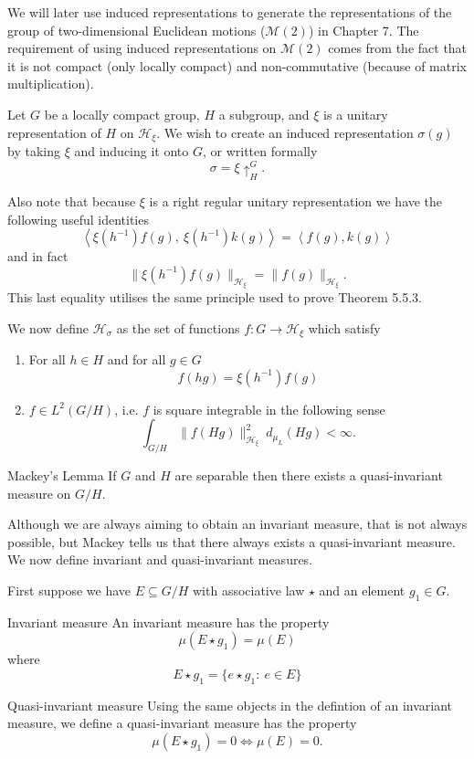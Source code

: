 \documentclass{article}
\begin{document}
We will later use induced representations to generate the representations of the group of two-dimensional Euclidean motions ($\mathcal{M}(2)$) in Chapter 7. The requirement of using induced representations on $\mathcal{M}(2)$ comes from the fact that it is not compact (only locally compact) and non-commutative (because of matrix multiplication). 

Let $G$ be a locally compact group, $H$ a subgroup, and $\xi$ is a unitary representation of $H$ on $\mathcal{H}_{\xi}$. We wish to create an induced representation $\sigma(g)$ by taking $\xi$ and inducing it onto $G$, or written formally 
\[ 
    \sigma = \xi \uparrow^{G}_{H}  
.\] 

\begin{remark}
Also note that because $\xi$ is a right regular unitary representation we have the following useful identities
\[ 
    \left\langle \xi(h^{-1})f(g), \ \xi(h^{-1})k(g) \right\rangle = \left\langle f(g), k(g) \right\rangle 
\]
and in fact
\[ 
    \| \xi(h^{-1})f(g) \|_{\mathcal{H}_{\xi}} = \| f(g) \|_{\mathcal{H}_{\xi}} .
\]
This last equality utilises the same principle used to prove Theorem 5.5.3.
\end{remark}

We now define $\mathcal{H}_{\sigma}$ as the set of functions $f: G \rightarrow \mathcal{H}_{\xi}$ which satisfy
\begin{enumerate}
    \item For all $h \in H$ and for all $g \in G$ 
        \[ 
            f(hg) = \xi(h^{-1})f(g) 
        \]
    \item $f \in L^{2}(G/H)$, i.e. $f$ is square integrable in the following sense
        \[%
            \int_{G/H} \| f(Hg) \|^{2}_{\mathcal{H}_{\xi}} \ d_{\mu_{L}}(Hg) < \infty.
        \]%
\end{enumerate}

\begin{Theorem}{Mackey's Lemma}
    If $G$ and $H$ are separable then there exists a quasi-invariant measure on $G/H$.\QED
\end{Theorem}

Although we are always aiming to obtain an invariant measure, that is not always possible, but Mackey tells us that there always exists a quasi-invariant measure. We now define invariant and quasi-invariant measures. 

First suppose we have $E \subseteq G/H$ with associative law $\star$ and an element $g_1 \in G$.
    

\begin{Define}{Invariant measure}
    An invariant measure has the property 
    \[ 
        \mu(E \star g_1) = \mu(E) 
    \] 
    where 
    \[ 
        E \star g_1  = \{ e \star g_1 : \ e \in E \} 
    \]
\end{Define}
\begin{Define}{Quasi-invariant measure}
    Using the same objects in the defintion of an invariant measure, we define a quasi-invariant measure has the property 
    \[ 
        \mu(E \star g_1) =0 \iff \mu(E) = 0 .
    \]
\end{Define}
\end{document}
